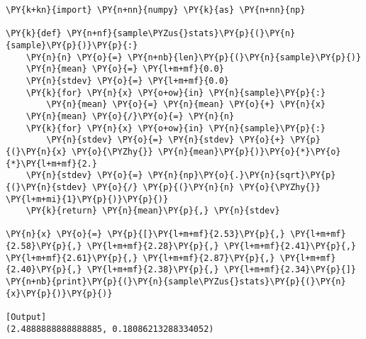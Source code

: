 \begin{Verbatim}[label=\makebox{\href{https://bitbucket.org/lbaldini/statnotes/src/master/snippets/sample\_stat\_naive.py}{https://bitbucket.org/.../sample\_stat\_naive.py}},commandchars=\\\{\}]
\PY{k+kn}{import} \PY{n+nn}{numpy} \PY{k}{as} \PY{n+nn}{np}

\PY{k}{def} \PY{n+nf}{sample\PYZus{}stats}\PY{p}{(}\PY{n}{sample}\PY{p}{)}\PY{p}{:}
    \PY{n}{n} \PY{o}{=} \PY{n+nb}{len}\PY{p}{(}\PY{n}{sample}\PY{p}{)}
    \PY{n}{mean} \PY{o}{=} \PY{l+m+mf}{0.0}
    \PY{n}{stdev} \PY{o}{=} \PY{l+m+mf}{0.0}
    \PY{k}{for} \PY{n}{x} \PY{o+ow}{in} \PY{n}{sample}\PY{p}{:}
        \PY{n}{mean} \PY{o}{=} \PY{n}{mean} \PY{o}{+} \PY{n}{x}
    \PY{n}{mean} \PY{o}{/}\PY{o}{=} \PY{n}{n}
    \PY{k}{for} \PY{n}{x} \PY{o+ow}{in} \PY{n}{sample}\PY{p}{:}
        \PY{n}{stdev} \PY{o}{=} \PY{n}{stdev} \PY{o}{+} \PY{p}{(}\PY{n}{x} \PY{o}{\PYZhy{}} \PY{n}{mean}\PY{p}{)}\PY{o}{*}\PY{o}{*}\PY{l+m+mf}{2.}
    \PY{n}{stdev} \PY{o}{=} \PY{n}{np}\PY{o}{.}\PY{n}{sqrt}\PY{p}{(}\PY{n}{stdev} \PY{o}{/} \PY{p}{(}\PY{n}{n} \PY{o}{\PYZhy{}} \PY{l+m+mi}{1}\PY{p}{)}\PY{p}{)}
    \PY{k}{return} \PY{n}{mean}\PY{p}{,} \PY{n}{stdev}

\PY{n}{x} \PY{o}{=} \PY{p}{[}\PY{l+m+mf}{2.53}\PY{p}{,} \PY{l+m+mf}{2.58}\PY{p}{,} \PY{l+m+mf}{2.28}\PY{p}{,} \PY{l+m+mf}{2.41}\PY{p}{,} \PY{l+m+mf}{2.61}\PY{p}{,} \PY{l+m+mf}{2.87}\PY{p}{,} \PY{l+m+mf}{2.40}\PY{p}{,} \PY{l+m+mf}{2.38}\PY{p}{,} \PY{l+m+mf}{2.34}\PY{p}{]}
\PY{n+nb}{print}\PY{p}{(}\PY{n}{sample\PYZus{}stats}\PY{p}{(}\PY{n}{x}\PY{p}{)}\PY{p}{)}

[Output]
(2.4888888888888885, 0.18086213288334052)
\end{Verbatim}